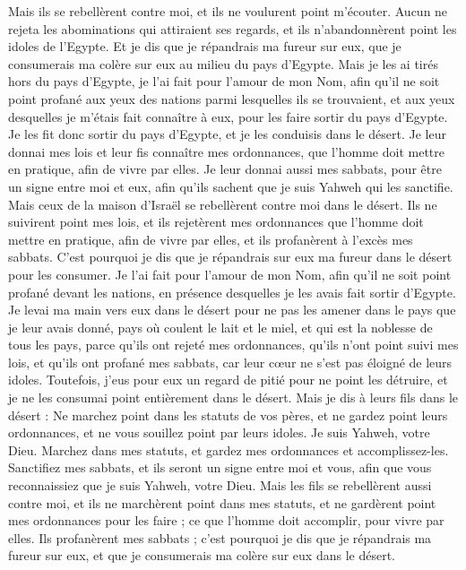 \begin{multicols}{2}
Mais ils se rebellèrent contre moi, et ils ne voulurent point m'écouter. Aucun ne rejeta les abominations qui attiraient ses regards,  et ils n’abandonnèrent point les idoles de l’Egypte. Et je dis que je répandrais ma fureur sur eux, que je consumerais ma colère sur eux au milieu du pays d'Egypte.
Mais je les ai tirés hors du pays d'Egypte, je l'ai fait pour l'amour de mon Nom, afin qu'il ne soit point profané aux yeux des nations parmi lesquelles ils se trouvaient, et aux yeux desquelles je m’étais fait connaître à eux, pour les faire sortir du pays d’Egypte.
Je les fit donc sortir du pays d'Egypte, et je les conduisis dans le désert.
Je leur donnai mes lois et leur fis connaître mes ordonnances, que l'homme doit mettre en pratique, afin de vivre par elles.
Je leur donnai aussi mes sabbats, pour être un signe entre moi et eux, afin qu'ils sachent que je suis Yahweh qui les sanctifie.
Mais ceux de la maison d'Israël se rebellèrent contre moi dans le désert. Ils ne suivirent point mes lois, et ils rejetèrent mes ordonnances que l'homme doit mettre en pratique, afin de vivre par elles, et ils profanèrent à l’excès mes sabbats. C’est pourquoi je dis que je répandrais sur eux ma fureur dans le désert pour les consumer.
Je l'ai fait pour l'amour de mon Nom, afin qu'il ne soit point profané devant les nations, en présence desquelles je les avais fait sortir d'Egypte.
Je levai ma main vers eux dans le désert pour ne pas les amener dans le pays que je leur avais donné, pays où coulent le lait et le miel, et qui est la noblesse de tous les pays,
parce qu'ils ont rejeté mes ordonnances, qu'ils n'ont point suivi mes lois, et qu'ils ont profané mes sabbats, car leur cœur ne s’est pas éloigné de leurs idoles.
Toutefois, j’eus pour eux un regard de pitié pour ne point les détruire, et je ne les consumai point entièrement dans le désert.
Mais je dis à leurs fils dans le désert : Ne marchez point dans les statuts de vos pères, et ne gardez point leurs ordonnances, et ne vous souillez point par leurs idoles.
Je suis Yahweh, votre Dieu. Marchez dans mes statuts, et gardez mes ordonnances et accomplissez-les.
Sanctifiez mes sabbats, et ils seront un signe entre moi et vous, afin que vous reconnaissiez que je suis Yahweh, votre Dieu.
Mais les fils se rebellèrent aussi contre moi, et ils ne marchèrent point dans mes statuts, et ne gardèrent point mes ordonnances pour les faire ; ce que l'homme doit accomplir, pour vivre par elles. Ils profanèrent mes sabbats ; c'est pourquoi je dis que je répandrais ma fureur sur eux, et que je consumerais ma colère sur eux dans le désert.

\end{multicols}
